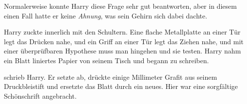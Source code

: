 Normalerweise konnte Harry diese Frage sehr gut beantworten, aber in diesem einen Fall hatte er keine \emph{Ahnung}, was sein Gehirn sich dabei dachte.

Harry zuckte innerlich mit den Schultern. Eine flache Metallplatte an einer Tür legt das Drücken nahe, und ein Griff an einer Tür legt das Ziehen nahe, und mit einer überprüfbaren Hypothese muss man hingehen und sie testen.
Harry nahm ein Blatt liniertes Papier von seinem Tisch und begann zu schreiben.

\begin{writtenNote}
\end{writtenNote}

\noindent schrieb Harry. Er setzte ab, drückte einige Millimeter Grafit aus seinem Druckbleistift und ersetzte das Blatt durch ein neues. Hier war eine sorgfältige Schönschrift angebracht.

